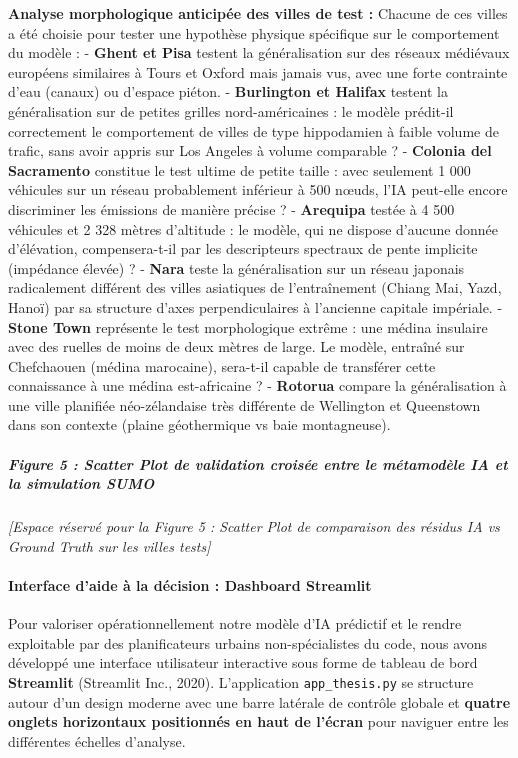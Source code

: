 \documentclass[10pt, a4paper]{article}
\begin{document}
\textbf{Analyse morphologique anticipée des villes de test :} Chacune de
ces villes a été choisie pour tester une hypothèse physique spécifique
sur le comportement du modèle : - \textbf{Ghent et Pisa} testent la
généralisation sur des réseaux médiévaux européens similaires à Tours et
Oxford mais jamais vus, avec une forte contrainte d'eau (canaux) ou
d'espace piéton. - \textbf{Burlington et Halifax} testent la
généralisation sur de petites grilles nord-américaines : le modèle
prédit-il correctement le comportement de villes de type hippodamien à
faible volume de trafic, sans avoir appris sur Los Angeles à volume
comparable ? - \textbf{Colonia del Sacramento} constitue le test ultime
de petite taille : avec seulement 1 000 véhicules sur un réseau
probablement inférieur à 500 nœuds, l'IA peut-elle encore discriminer
les émissions de manière précise ? - \textbf{Arequipa} testée à 4 500
véhicules et 2 328 mètres d'altitude : le modèle, qui ne dispose
d'aucune donnée d'élévation, compensera-t-il par les descripteurs
spectraux de pente implicite (impédance élevée) ? - \textbf{Nara} teste
la généralisation sur un réseau japonais radicalement différent des
villes asiatiques de l'entraînement (Chiang Mai, Yazd, Hanoï) par sa
structure d'axes perpendiculaires à l'ancienne capitale impériale. -
\textbf{Stone Town} représente le test morphologique extrême : une
médina insulaire avec des ruelles de moins de deux mètres de large. Le
modèle, entraîné sur Chefchaouen (médina marocaine), sera-t-il capable
de transférer cette connaissance à une médina est-africaine ? -
\textbf{Rotorua} compare la généralisation à une ville planifiée
néo-zélandaise très différente de Wellington et Queenstown dans son
contexte (plaine géothermique vs baie montagneuse).

\subparagraph{Figure 5 : Scatter Plot de validation croisée entre le
métamodèle IA et la simulation
SUMO}\label{figure-5-scatter-plot-de-validation-croisuxe9e-entre-le-muxe9tamoduxe8le-ia-et-la-simulation-sumo}

\emph{{[}Espace réservé pour la Figure 5 : Scatter Plot de comparaison
des résidus IA vs Ground Truth sur les villes tests{]}}

\paragraph{Interface d'aide à la décision : Dashboard
Streamlit}\label{interface-daide-uxe0-la-duxe9cision-dashboard-streamlit}

Pour valoriser opérationnellement notre modèle d'IA prédictif et le
rendre exploitable par des planificateurs urbains non-spécialistes du
code, nous avons développé une interface utilisateur interactive sous
forme de tableau de bord \textbf{Streamlit} (Streamlit Inc., 2020).
L'application \texttt{app\_thesis.py} se structure autour d'un design
moderne avec une barre latérale de contrôle globale et \textbf{quatre
onglets horizontaux positionnés en haut de l'écran} pour naviguer entre
les différentes échelles d'analyse.
\end{document}
